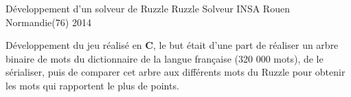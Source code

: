 \begin{cventries}
  \cventry
	{Développement d'un solveur de Ruzzle} %
	{Ruzzle Solveur} %
	{INSA Rouen Normandie(76)} %
	{2014} %
	{
		\begin{cvitems} %
			\item {Développement du jeu réalisé en \textbf{C}, le but était d'une part de réaliser un arbre binaire de mots du dictionnaire de la langue française (320 000 mots), de le sérialiser, puis de comparer cet arbre aux différents mots du Ruzzle pour obtenir les mots qui rapportent le plus de points.}
		\end{cvitems}
	}

\end{cventries}
